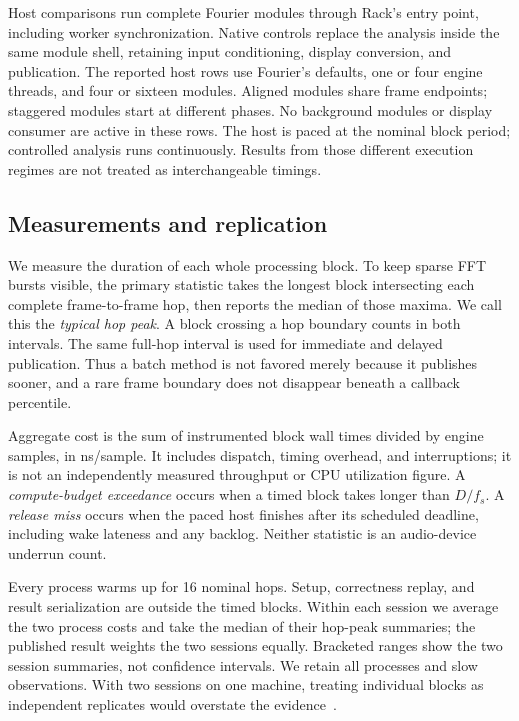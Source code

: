 Host comparisons run complete Fourier modules through Rack's
 entry point, including worker synchronization. Native
controls replace the analysis inside the same module shell, retaining input
conditioning, display conversion, and publication. The reported host rows use
Fourier's defaults, one or four engine threads, and four or sixteen modules.
Aligned modules share frame endpoints; staggered modules start at different
phases. No background modules or display consumer are active in these rows.
The host is paced at the nominal block period; controlled analysis runs
continuously. Results from those different execution regimes are not treated
as interchangeable timings.

\subsection{Measurements and replication}
We measure the duration of each whole processing block. To keep sparse FFT
bursts visible, the primary statistic takes the longest block intersecting
each complete frame-to-frame hop, then reports the median of those maxima.
We call this the \emph{typical hop peak}. A block crossing a hop boundary
counts in both intervals. The same full-hop interval is used for immediate
and delayed publication. Thus a batch method is not favored merely because
it publishes sooner, and a rare frame boundary does not disappear beneath a
callback percentile.

Aggregate cost is the sum of instrumented block wall times divided by engine
samples, in ns/sample. It includes dispatch, timing overhead, and
interruptions; it is not an independently measured throughput or CPU
utilization figure. A \emph{compute-budget exceedance} occurs when a timed
block takes longer than $D/f_s$. A \emph{release miss} occurs when the paced
host finishes after its scheduled deadline, including wake lateness and any
backlog. Neither statistic is an audio-device underrun count.

Every process warms up for 16 nominal hops. Setup, correctness replay, and
result serialization are outside the timed blocks. Within each session we
average the two process costs and take the median of their hop-peak
summaries; the published result weights the two sessions equally. Bracketed
ranges show the two session summaries, not confidence intervals. We retain
all processes and slow observations. With two sessions on one machine,
treating individual blocks as independent replicates would overstate the
evidence~\cite{kalibera2013}.


